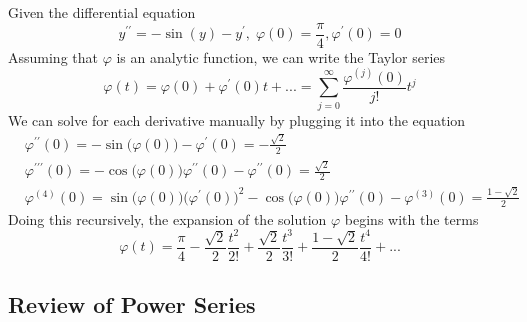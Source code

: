 \documentclass{article}
\newcounter{example}[section]
\begin{document}
  \begin{example}
    \label{ex:series-solution-of-a-nonlinear-ivp}
  Given the differential equation
  \begin{equation}
    y^{\prime \prime} = -\sin{(y)} - y^\prime, \; \varphi(0) = \frac{\pi}{4}, \varphi^\prime (0) = 0
  \end{equation}
  Assuming that $\varphi$ is an analytic function, we can write the Taylor series 
  \begin{equation}
    \varphi(t) = \varphi(0) + \varphi^\prime (0) t + ... = \sum_{j=0}^\infty \frac{\varphi^{(j)} (0)}{j!} t^j
  \end{equation}
  We can solve for each derivative manually by plugging it into the equation
  \begin{align*}
      & \varphi^{\prime\prime} (0) = -\sin{\big( \varphi(0)\big)} - \varphi^\prime (0) = - \frac{\sqrt{2}}{2} \\
      & \varphi^{\prime\prime\prime} (0) = -\cos{\big(\varphi(0)\big)} \varphi^{\prime\prime}(0) - \varphi^{\prime\prime} (0) = \frac{\sqrt{2}}{2} \\
      & \varphi^{(4)} (0) = \sin{\Big(\varphi(0)\big)} \big( \varphi^\prime (0)\big)^2 - \cos{\Big(\varphi(0)\big)} \varphi^{\prime\prime} (0) - \varphi^{(3)} (0) = \frac{1-\sqrt{2}}{2}
  \end{align*}
  Doing this recursively, the expansion of the solution $\varphi$ begins with the terms 
  \begin{equation}
    \varphi(t) = \frac{\pi}{4} - \frac{\sqrt{2}}{2} \frac{t^2}{2!} + \frac{\sqrt{2}}{2} \frac{t^3}{3!} + \frac{1-\sqrt{2}}{2} \frac{t^4}{4!} + ...
  \end{equation}
  \end{example}

  \subsection{Review of Power Series}
\end{document}
